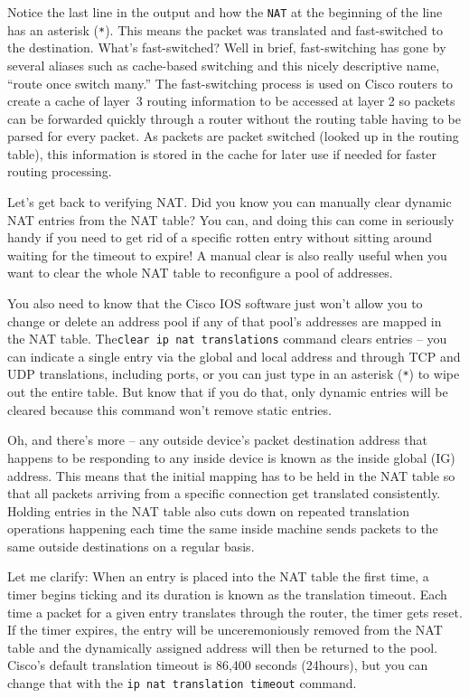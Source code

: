 Notice the last line in the output and how the \texttt{NAT} at the
beginning of the line has an asterisk (\texttt{*}). This means the
packet was translated and fast-switched to the destination. What's
fast-switched? Well in brief, fast-switching has gone by several aliases
such as cache-based switching and this nicely descriptive name, ``route
once switch many.'' The fast-switching process is used on Cisco routers
to create a cache of layer~3 routing information to be accessed at layer
2 so packets can be forwarded quickly through a router without the
routing table having to be parsed for every packet. As packets are
packet switched (looked up in the routing table), this information is
stored in the cache for later use if needed for faster routing
processing.

Let's get back to verifying NAT. Did you know you can manually clear
dynamic NAT entries from the NAT table? You can, and doing this can come
in seriously handy if you need to get rid of a specific rotten entry
without sitting around waiting for the timeout to expire! A manual clear
is also really useful when you want to clear the whole NAT table to
reconfigure a pool of addresses.

You also need to know that the Cisco IOS software just won't allow you
to change or delete an address pool if any of that pool's addresses are
mapped in the NAT table. The\texttt{clear\ ip\ nat\ translations}
command clears entries -- you can indicate a single entry via the global
and local address and through TCP and UDP translations, including ports,
or you can just type in an asterisk (\texttt{*}) to wipe out the entire
table. But know that if you do that, only dynamic entries will be
cleared because this command won't remove static entries.

Oh, and there's more -- any outside device's packet destination address
that happens to be responding to any inside device is known as the
inside global (IG) address. This means that the initial mapping has to
be held in the NAT table so that all packets arriving from a specific
connection get translated consistently. Holding entries in the NAT table
also cuts down on repeated translation operations happening each time
the same inside machine sends packets to the same outside destinations
on a regular basis.

Let me clarify: When an entry is placed into the NAT table the first
time, a timer begins ticking and its duration is known as the
translation timeout. Each time a packet for a given entry translates
through the router, the timer gets reset. If the timer expires, the
entry will be unceremoniously removed from the NAT table and the
dynamically assigned address will then be returned to the pool. Cisco's
default translation timeout is 86,400 seconds (24hours), but you can
change that with the \texttt{ip\ nat\ translation\ timeout} command.


